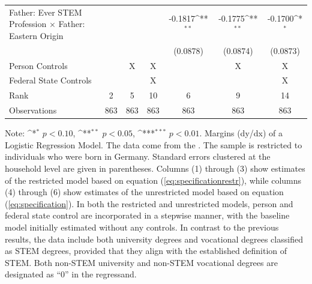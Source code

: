 \documentclass[a4paper, oneside, hyperfootnotes = false]{article}
\def\sym#1{\ifmmode^{#1}\else\(^{#1}\)\fi}
\begin{document}
{\begin{landscape}
\begin{table}[ht]
\begin{center}
{\begin{tabular}{l*{6}{c}}
					\addlinespace
					Father: Ever STEM Profession $\times$ Father: Eastern Origin&                     &                     &                     &     -0.1817\sym{**} &     -0.1775\sym{**} &     -0.1700\sym{*}  \\
					&                     &                     &                     &    (0.0878)         &    (0.0874)         &    (0.0873)         \\
					\midrule
					Person Controls & & X  & X & & X & X \\
					Federal State Controls & & & X & & & X \\
					Rank                &      2         &      5         &     10         &      6         &      9         &     14         \\
					Observations &    863         &    863         &    863         &    863         &    863         &    863         \\
					\bottomrule
			\end{tabular}}
			
			\vspace{2mm}
			
			\parbox{15cm}{
				\linespread{1}\footnotesize Note: \sym{*} \(p<0.10\), \sym{**} \(p<0.05\), \sym{***} \(p<0.01\). Margins (dy/dx) of a Logistic Regression Model. The data come from the \cite{SOEP2023}. The sample is restricted to individuals who were born in Germany. Standard errors clustered at the household level are given in parentheses. Columns (1) through (3) show estimates of the restricted model based on equation (\ref{eq:specificationrestr}), while columns (4) through (6) show estimates of the unrestricted model based on equation (\ref{eq:specification}). In both the restricted and unrestricted models, person and federal state control are incorporated in a stepwise manner, with the baseline model initially estimated without any controls. In contrast to the previous results, the data include both university degrees and vocational degrees classified as STEM degrees, provided that they align with the established definition of STEM. Both non-STEM university and non-STEM vocational degrees are designated as ``0'' in the regressand.}
			
		\end{center}
	\end{table}
\end{landscape}

\clearpage

}
\end{document}
